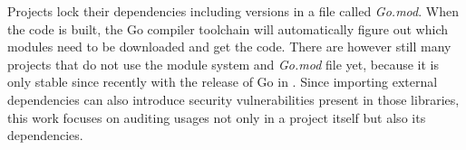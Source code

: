 

Projects lock their dependencies including versions in a file called \textit{Go.mod}.
When the code is built, the Go compiler toolchain will automatically figure out which modules need to be downloaded and
get the code.
There are however still many projects that do not use the module system and \textit{Go.mod} file yet, because it is only
stable since recently with the release of Go  in .
Since importing external dependencies can also introduce security vulnerabilities present in those libraries, this work
focuses on auditing \unsafe{} usages not only in a project itself but also its dependencies.
